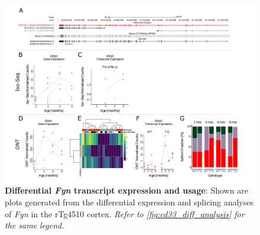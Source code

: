 \begin{landscape}
	\begin{figure}[htp]
		\begin{center}
			\includegraphics[page=10,trim={0 0.5cm 0 1.5cm},scale =0.85]{Figures/TargetGene_DifferentialAnalysis.pdf}
		\end{center}
		\captionsetup{width=1.5\textwidth}
		\caption[Differential \textit{Fyn} transcript expression and usage]%
		{\textbf{Differential \textit{Fyn} transcript expression and usage}: Shown are plots generated from the differential expression and splicing analyses of \textit{Fyn} in the rTg4510 cortex. \textit{Refer to \cref{fig:cd33_diff_analysis} for the same legend.}}   
		\label{fig:Fyn_diff_analysis}
	\end{figure}
\end{landscape}

